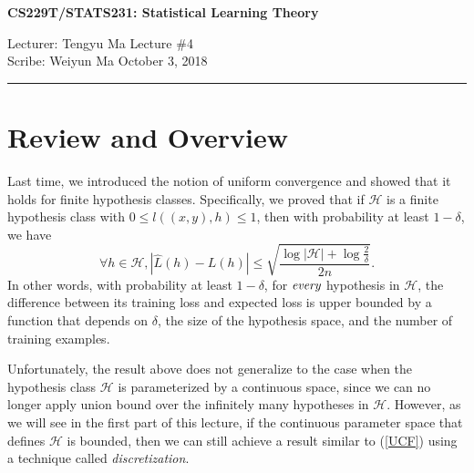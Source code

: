 \documentclass[11pt]{article}
\newcommand{\draftnotice}{\vbox to 0.25in{\noindent
   \raisebox{0.6in}[0in][0in]{\makebox[\textwidth][r]{\it
    DRAFT --- a final version will be posted shortly}}}
   \vspace{-.25in}\vspace{-\baselineskip}
}
\begin{document}
\thispagestyle{empty}


\begin{center}
\bf\large CS229T/STATS231: Statistical Learning Theory
\end{center}

\noindent
Lecturer: Tengyu Ma   %
\hfill
Lecture \#4               %
\\
Scribe: Weiyun Ma                 %
\hfill
October 3, 2018           %

\noindent
\rule{\textwidth}{1pt}

\medskip


\section{Review and Overview}
%
Last time, we introduced the notion of uniform convergence and showed that it holds for finite hypothesis classes. Specifically, we proved that if $\mathcal H$ is a finite hypothesis class with $0 \le l((x,y), h) \le 1$, then with probability at least $1 - \delta$, we have
\begin{equation} \label{UCF}
\forall h\in \mathcal H, |\hat L(h) - L(h)|\le \sqrt{\frac{\log|\mathcal H| + \log \frac{2}{\delta}}{2n}}.\end{equation}
In other words, with probability at least $1-\delta$, for $\emph{every}$ hypothesis in $\mathcal H$, the difference between its training loss and expected loss is upper bounded by a function that depends on $\delta$, the size of the hypothesis space, and the number of training examples.

Unfortunately, the result above does not generalize to the case when the hypothesis class $\mathcal H$ is parameterized by a continuous space, since we can no longer apply union bound over the infinitely many hypotheses in $\mathcal H$. However, as we will see in the first part of this lecture, if the continuous parameter space that defines $\mathcal H$ is bounded, then we can still achieve a result similar to (\ref{UCF}) using a technique called \emph{discretization}.
\end{document}
